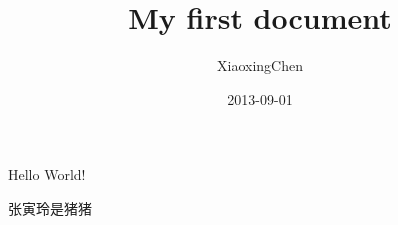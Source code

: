 \documentclass{article}
\title{My first document}
\date{2013-09-01}
\author{XiaoxingChen}
\begin{document}
  \maketitle
  \newpage

  Hello World!

    \begin{CJK*}{UTF8}{gbsn}
    张寅玲是猪猪
    \end{CJK*}
\end{document}
